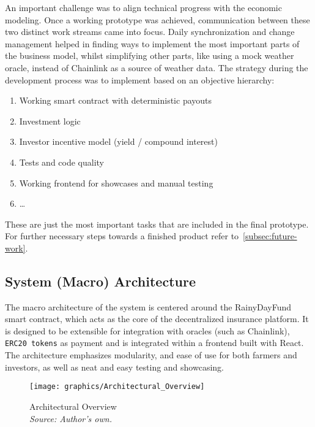 \documentclass[11pt,a4paper]{article}
\begin{document}
		An important challenge was to align technical progress with the economic modeling.
		Once a working prototype was achieved, communication between these two distinct work streams came into focus.
		Daily synchronization and change management helped in finding ways to implement the most important parts of the business model, whilst simplifying other parts, like using a mock weather oracle, instead of Chainlink as a source of weather data.
		The strategy during the development process was to implement based on an objective hierarchy:

		\begin{enumerate}[1]
			\item Working smart contract with deterministic payouts
			\item Investment logic
			\item Investor incentive model (yield / compound interest)
			\item Tests and code quality
			\item Working frontend for showcases and manual testing
			\item \ldots
		\end{enumerate}

		These are just the most important tasks that are included in the final prototype.
		For further necessary steps towards a finished product refer to~\ref{subsec:future-work}.


		\subsection{System (Macro) Architecture}\label{subsec:system-architecture}
		The macro architecture of the system is centered around the RainyDayFund smart contract, which acts as the core of the decentralized insurance platform.
		It is designed to be extensible for integration with oracles (such as Chainlink), \texttt{ERC20 tokens} as payment and is integrated within a frontend built with React.
		The architecture emphasizes modularity, and ease of use for both farmers and investors, as well as neat and easy testing and showcasing.

		\begin{figure}[htbp]
			\centering
			\texttt{[image: graphics/Architectural\_Overview]}
			\caption{Architectural Overview \\ \textit{Source: Author's own.}}
			\label{fig:architecture}
		\end{figure}
\end{document}
